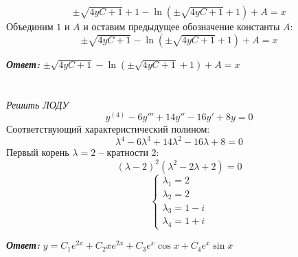\documentclass[a5paper, 10pt]{article}
\theoremstyle{definition}
\theoremstyle{plain}
\theoremstyle{remark}
\begin{document}
\begin{equation}
 \pm \sqrt{4yC + 1} + 1 - \ln \left( \pm \sqrt{4yC + 1} + 1 \right) + A = x
\end{equation}
Объединим $1$ и $A$ и оставим предыдущее обозначение константы $A$:
\begin{equation}
 \pm \sqrt{4yC + 1} - \ln \left( \pm \sqrt{4yC + 1} + 1 \right) + A = x
\end{equation}

\textbf{\textit{Ответ:}} $ \pm \sqrt{4yC + 1} - \ln \left( \pm \sqrt{4yC + 1} + 1 \right) + A = x$

\newpage
\section{}
\textit{Решить ЛОДУ}
\\
\begin{equation}
y^{(4)} - 6y'''+14y''-16y'+8y=0
\end{equation}
Соответствующий характеристический полином:
\begin{equation}
\lambda^4 - 6\lambda^3+14\lambda^2-16\lambda+8=0
\end{equation}
Первый корень $\lambda = 2$ -- кратности 2:
\begin{equation}
\left( \lambda - 2 \right)^2 \left( \lambda^2 - 2\lambda + 2 \right) = 0
\end{equation}
\begin{equation}
\begin{cases}
\lambda_1 = 2\\
\lambda_2 = 2\\
\lambda_3 = 1 - i\\
\lambda_4 = 1 + i
\end{cases}
\end{equation}

\textbf{\textit{Ответ:}} $y = C_1e^{2x} + C_2 x e^{2x} + C_3 e^x \cos x + C_4 e^x \sin x $

\newpage
\end{document}
